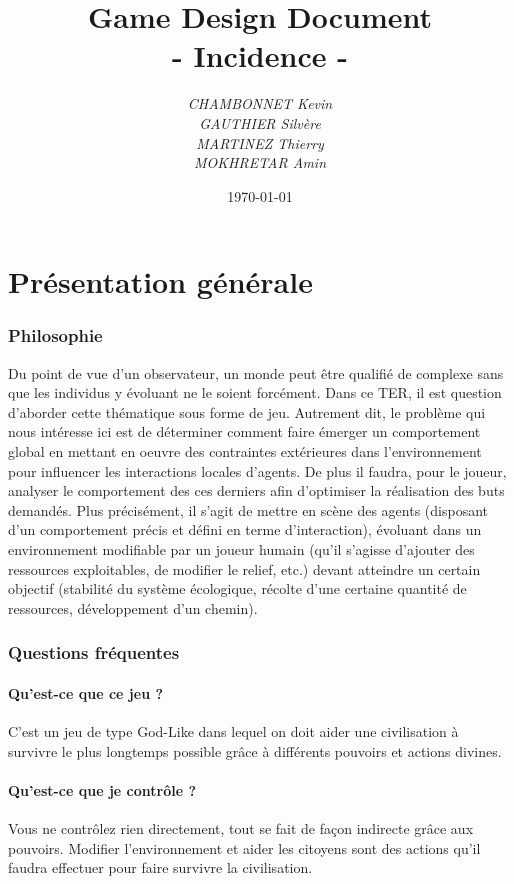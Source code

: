 \documentclass[a4paper]{article}
\title{\textbf{Game Design Document}\\- \Huge{Incidence} -}
\author{\emph{CHAMBONNET Kevin}\\\emph{GAUTHIER Silvère}\\\emph{MARTINEZ Thierry}\\\emph{MOKHRETAR Amin}}
\date{\today}
\newcommand{\alinea}{\hspace*{0.5cm}}
\begin{document}
  \maketitle
  \newpage
  \tableofcontents


  \newpage
  \part{Présentation générale}
    \section{Philosophie}
      \alinea Du point de vue d’un observateur, un monde peut être qualifié de complexe sans que les individus y évoluant ne le soient forcément. Dans ce TER, il est question d’aborder cette thématique sous forme de jeu. Autrement dit, le problème qui nous intéresse ici est de déterminer comment faire émerger un comportement global en mettant en oeuvre des contraintes extérieures dans l’environnement pour influencer les interactions locales d’agents. De plus il faudra, pour le joueur, analyser le comportement des ces derniers afin d’optimiser la réalisation des buts demandés. Plus précisément, il s’agit de mettre en scène des agents (disposant d’un comportement précis et défini en terme d’interaction), évoluant dans un environnement modifiable par un joueur humain (qu’il s’agisse d’ajouter des ressources exploitables, de modifier le relief, etc.) devant atteindre un certain objectif (stabilité du système écologique, récolte d’une certaine quantité de ressources, développement d’un chemin).

    \section{Questions fréquentes}
      \subsection{Qu'est-ce que ce jeu ?}
        \alinea C'est un jeu de type God-Like dans lequel on doit aider une civilisation à survivre le plus longtemps possible grâce à différents pouvoirs et actions divines.
			
      \subsection{Qu'est-ce que je contrôle ?}
        \alinea Vous ne contrôlez rien directement, tout se fait de façon indirecte grâce aux pouvoirs. Modifier l'environnement et aider les citoyens sont des actions qu'il faudra effectuer pour faire survivre la civilisation.
\end{document}
